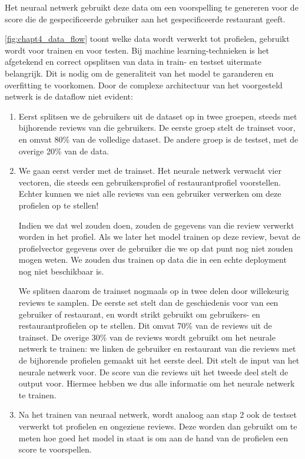 Het neuraal netwerk gebruikt deze data om een voorspelling te genereren voor de score die de gespecificeerde gebruiker aan het gespecificeerde restaurant geeft.

\autoref{fig:chapt4_data_flow} toont welke data wordt verwerkt tot profielen, gebruikt wordt voor trainen en voor testen. Bij machine learning-technieken is het afgetekend en correct opsplitsen van data in train- en testset uitermate belangrijk. Dit is nodig om de generaliteit van het model te garanderen en overfitting te voorkomen. Door de complexe architectuur van het voorgesteld netwerk is de dataflow niet evident:

\begin{enumerate}
    \item Eerst splitsen we de gebruikers uit de dataset op in twee groepen, steeds met bijhorende reviews van die gebruikers. De eerste groep stelt de trainset voor, en omvat 80\% van de volledige dataset. De andere groep is de testset, met de overige 20\% van de data.
    \item We gaan eerst verder met de trainset. Het neurale netwerk verwacht vier vectoren, die steeds een gebruikersprofiel of restaurantprofiel voorstellen. Echter kunnen we niet alle reviews van een gebruiker verwerken om deze profielen op te stellen! 
    
    Indien we dat wel zouden doen, zouden de gegevens van die review verwerkt worden in het profiel. Als we later het model trainen op deze review, bevat de profielvector gegevens over de gebruiker die we op dat punt nog niet zouden mogen weten. We zouden dus trainen op data die in een echte deployment nog niet beschikbaar is.

    We splitsen daarom de trainset nogmaals op in twee delen door willekeurig reviews te samplen. De eerste set stelt dan de geschiedenis voor van een gebruiker of restaurant, en wordt strikt gebruikt om gebruikers- en restaurantprofielen op te stellen. Dit omvat 70\% van de reviews uit de trainset.\newline
    De overige 30\% van de reviews wordt gebruikt om het neurale netwerk te trainen: we linken de gebruiker en restaurant van die reviews met de bijhorende profielen gemaakt uit het eerste deel. Dit stelt de input van het neurale netwerk voor. De score van die reviews uit het tweede deel stelt de output voor. Hiermee hebben we dus alle informatie om het neurale netwerk te trainen. 

    \item Na het trainen van neuraal netwerk, wordt analoog aan stap 2 ook de testset verwerkt tot profielen en ongeziene reviews. Deze worden dan gebruikt om te meten hoe goed het model in staat is om aan de hand van de profielen een score te voorspellen.


\end{enumerate}
